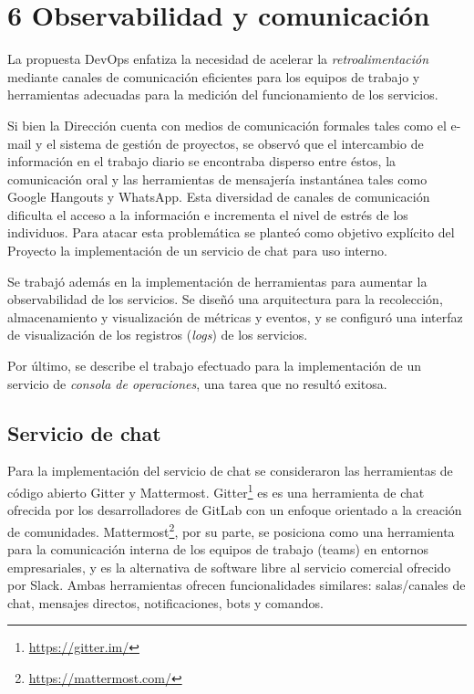 \section{6 Observabilidad y comunicación}

La propuesta DevOps enfatiza la necesidad de acelerar la \textit{retroalimentación} mediante canales de comunicación eficientes para los equipos de trabajo y herramientas adecuadas para la medición del funcionamiento de los servicios.

Si bien la Dirección cuenta con medios de comunicación formales tales como el e-mail y el sistema de gestión de proyectos, se observó que el intercambio de información en el trabajo diario se encontraba disperso entre éstos, la comunicación oral y las herramientas de mensajería instantánea tales como Google Hangouts y WhatsApp. Esta diversidad de canales de comunicación dificulta el acceso a la información e incrementa el nivel de estrés de los individuos. Para atacar esta problemática se planteó como objetivo explícito del Proyecto la implementación de un servicio de chat para uso interno.

Se trabajó además en la implementación de herramientas para aumentar la observabilidad de los servicios. Se diseñó una arquitectura para la recolección, almacenamiento y visualización de métricas y eventos, y se configuró una interfaz de visualización de los registros (\textit{logs}) de los servicios.

Por último, se describe el trabajo efectuado para la implementación de un servicio de \textit{consola de operaciones}, una tarea que no resultó exitosa.

\subsection{Servicio de chat}

Para la implementación del servicio de chat se consideraron las herramientas de código abierto Gitter y Mattermost. Gitter\footnote{ \href{https://gitter.im/}{https://gitter.im/}} es es una herramienta de chat ofrecida por los desarrolladores de GitLab con un enfoque orientado a la creación de comunidades. Mattermost\footnote{ \href{https://mattermost.com/}{https://mattermost.com/} }, por su parte, se posiciona como una herramienta para la comunicación interna de los equipos de trabajo (teams) en entornos empresariales, y es la alternativa de software libre al servicio comercial ofrecido por Slack. Ambas herramientas ofrecen funcionalidades similares: salas/canales de chat, mensajes directos, notificaciones, bots y comandos.

